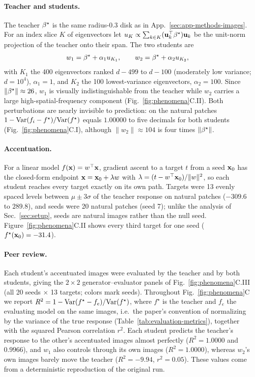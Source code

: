 \paragraph{Teacher and students.}
The teacher ${\beta^{\star}}$ is the same radius-$0.3$ disk as in
App.~\ref{sec:app-methods-images}.  For an index slice $K$ of eigenvectors let
$u_K\propto\sum_{k\in K}({\mathbf{u}}_k^\top{\beta^{\star}}){\mathbf{u}}_k$ be the unit-norm projection
of the teacher onto their span.  The two students are
\[
w_1={\beta^{\star}}+\alpha_1u_{K_1},\qquad w_2={\beta^{\star}}+\alpha_2u_{K_2},
\]
with $K_1$ the 400 eigenvectors ranked $d-499$ to $d-100$ (moderately low
variance; $d=10^4$), $\alpha_1=1$, and $K_2$ the 100 lowest-variance eigenvectors,
$\alpha_2=100$.  Since $\|{\beta^{\star}}\|\approx26$, $w_1$ is visually
indistinguishable from the teacher while $w_2$ carries a large
high-spatial-frequency component (Fig.~\ref{fig:phenomena}C.II).  Both
perturbations are nearly invisible to prediction: on the natural patches
$1-\mathrm{Var}(f_i-f^\star)/\mathrm{Var}(f^\star)$ equals $1.00000$ to five decimals for both
students (Fig.~\ref{fig:phenomena}C.I), although $\|w_2\|\approx104$ is four
times $\|{\beta^{\star}}\|$.

\paragraph{Accentuation.}
For a linear model $f(\mathbf{x})=w^\top\mathbf{x}$, gradient ascent to a target $t$ from a
seed $\mathbf{x}_0$ has the closed-form endpoint $\mathbf{x}=\mathbf{x}_0+\lambda w$ with
$\lambda=(t-w^\top\mathbf{x}_0)/\|w\|^2$, so each student reaches every target
exactly on its own path.  Targets were 13 evenly spaced levels between
$\mu\pm3\sigma$ of the teacher response on natural patches
($-309.6$ to $289.8$), and seeds were 20 natural patches (seed 7); unlike
the analysis of Sec.~\ref{sec:setup}, seeds are natural images rather than
the null seed.  Figure~\ref{fig:phenomena}C.II shows every third target for
one seed ($f^\star(\mathbf{x}_0)=-31.4$).

\paragraph{Peer review.}
Each student's accentuated images were evaluated by the teacher and by both
students, giving the $2\times2$ generator--evaluator panels of
Fig.~\ref{fig:phenomena}C.III (all 20 seeds $\times$ 13 targets; colors mark
seeds).  Throughout Fig.~\ref{fig:phenomena}C we report
$R^2=1-\mathrm{Var}(f^\star-f_e)/\mathrm{Var}(f^\star)$, where $f^\star$ is the teacher and $f_e$
the evaluating model on the same images, i.e.\ the paper's convention of
normalizing by the variance of the true response
(Table~\ref{tab:evaluation-metrics}), together with the squared Pearson
correlation $r^2$.  Each student predicts the teacher's response to the other's accentuated
images almost perfectly ($R^2=1.0000$ and $0.9966$), and $w_1$ also controls
through its own images ($R^2=1.0000$), whereas $w_2$'s own images barely move the teacher
($R^2=-9.94$, $r^2=0.05$).  These values come from a deterministic
reproduction of the original run.

